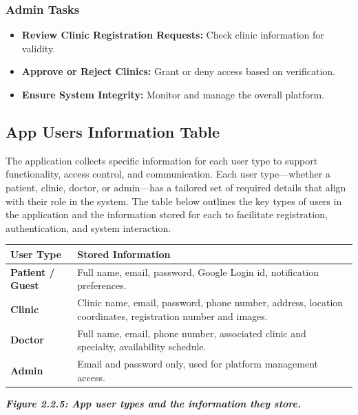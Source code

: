 \documentclass[12pt]{report}
\begin{document}
\subsubsection{\textbf{Admin Tasks}}
\begin{itemize}
	\item \textbf{Review Clinic Registration Requests:} Check clinic information for validity.
	\item \textbf{Approve or Reject Clinics:} Grant or deny access based on verification.
	\item \textbf{Ensure System Integrity:} Monitor and manage the overall platform.
\end{itemize}




\subsection{App Users Information Table}
\noindent The application collects specific information for each user type to support functionality, access control, and communication. Each user type—whether a patient, clinic, doctor, or admin—has a tailored set of required details that align with their role in the system. The table below outlines the key types of users in the application and the information stored for each to facilitate registration, authentication, and system interaction.
\vspace{0.3cm}
\begin{table}[H]
	\centering
	\renewcommand{\arraystretch}{1.3}
	\begin{tabular}{|p{4cm}|p{11.5cm}|}
	\hline
	\rowcolor[HTML]{C0C0C0}
	\textbf{User Type} & \textbf{Stored Information} \\
	\hline
	
	\hspace{0.5cm}\textbf{Patient / Guest} & 
	Full name, email, password, Google Login id, notification preferences. \\
	\hline
	
	\hspace{1.4cm}\textbf{Clinic} & 
	Clinic name, email, password, phone number, address, location coordinates, registration number and images. \\
	\hline
	
	\hspace{1.4cm}\textbf{Doctor} & 
	Full name, email, phone number, associated clinic and specialty, availability schedule. \\
	\hline
	
	\hspace{1.4cm}\textbf{Admin} & 
	Email and password only, used for platform management access. \\
	\hline
	
	\end{tabular}
	\begin{center}
	    \vspace{0.5cm}
		\textit{\textbf{Figure 2.2.5: App user types and the information they store.}}
	\end{center}
	\end{table}
	
\end{document}
